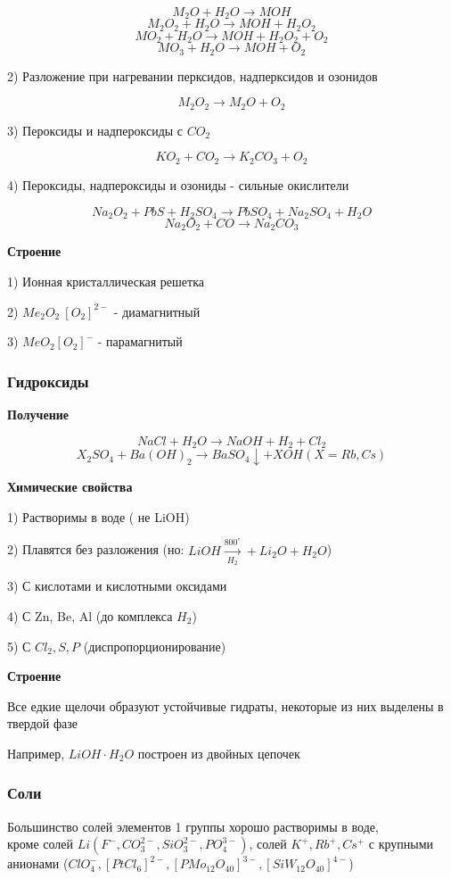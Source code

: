 $$M_2O + H_2O \rightarrow MOH$$
$$M_2O_2 + H_2O \rightarrow MOH + H_2O_2$$
$$MO_2 + H_2O \rightarrow MOH + H_2O_2 + O_2$$
$$MO_3 + H_2O \rightarrow MOH + O_2$$

2) Разложение при нагревании перксидов, надперксидов и озонидов

$$M_2O_2 \rightarrow M_2O + O_2$$

3) Пероксиды и надпероксиды с $CO_2$

$$KO_2  + CO_2 \rightarrow K_2CO_3 + O_2$$

4) Пероксиды, надпероксиды и озониды - сильные окислители

$$Na_2O_2 + PbS + H_2SO_4 \rightarrow PbSO_4 + Na_2SO_4 + H_2O$$
$$Na_2O_2 + CO \rightarrow Na_2CO_3$$

\textbf{Строение}

1) Ионная кристаллическая решетка

2) $Me_2O_2 \ [O_2]^{2-}$ - диамагнитный

3) $MeO_2 [O_2]^- $ - парамагнитый

\subsubsection*{Гидроксиды}

\textbf{Получение}

$$NaCl + H_2O \rightarrow NaOH + H_2 + Cl_2$$
$$X_2SO_4 + Ba(OH)_2 \rightarrow BaSO_4 \downarrow + XOH (X=Rb,Cs)$$

\textbf{Химические свойства}

1) Растворимы в воде ( не  LiOH)

2) Плавятся без разложения
(но: $LiOH \xrightarrow[H_2]{800^{\circ}} + Li_2O + H_2O$)

3) С кислотами и кислотными оксидами

4) С Zn, Be, Al (до комплекса $H_2$)

5) С $Cl_2, S, P$ (диспропорционирование)

\textbf{Строение}

Все едкие щелочи образуют устойчивые гидраты, некоторые из них выделены в твердой фазе

Например, $LiOH\cdot H_2O$ построен из двойных цепочек

\subsubsection*{Соли}

Большинство солей элементов 1 группы хорошо растворимы в воде,\\
кроме солей $Li (F^-, CO_3^{2-}, SiO_3^{2-}, PO_4^{3-})$, солей $K^+, Rb^+, Cs^+$ с крупными анионами ($ClO_4^-, [PtCl_6]^{2-}, [PMo_{12}O_{40}]^{3-}, [SiW_{12}O_{40}]^{4-}$)

